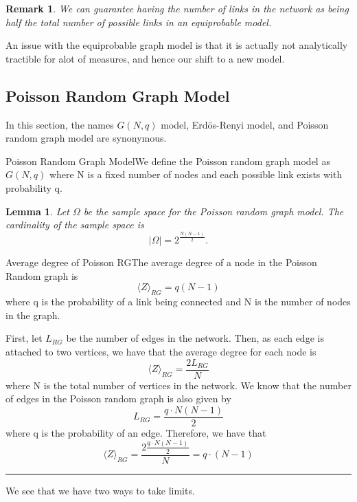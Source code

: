 \documentclass[twoside]{article}
\newtheorem{lemma}[theorem]{Lemma}
\newtheorem{remark}[theorem]{Remark}
\newenvironment{proof}{{\bf Proof:}}{\hfill\rule{2mm}{2mm}}
\begin{document}
\begin{remark}We can guarantee having the number of links in the network as being half the total number of possible links in an equiprobable model.
\end{remark}

An issue with the equiprobable graph model is that it is actually not analytically tractible for alot of measures, and hence our shift to a new model.

\subsection{Poisson Random Graph Model}

In this section, the names $G(N,q)$ model, Erdös-Renyi model, and Poisson random graph model are synonymous.
\begin{definition_exam}{Poisson Random Graph Model}{}We define the Poisson random graph model as $G(N,q)$ where N is a fixed number of nodes and each possible link exists with probability q. 
\end{definition_exam}

\begin{lemma}Let $\Omega$ be the sample space for the Poisson random graph model. The cardinality of the sample space is 
$$
|\Omega| = 2^{\frac{N(N-1)}{2}}.
$$
\end{lemma}

\begin{proposition_exam}{Average degree of Poisson RG}{}The average degree of a node in the Poisson Random graph is 
$$
\langle Z \rangle_{RG} = q(N - 1)
$$
where q is the probability of a link being connected and N is the number of nodes in the graph.
\end{proposition_exam}

\begin{proof} First, let $L_{RG}$ be the number of edges in the network. Then, as each edge is attached to two vertices, we have that the average degree for each node is 
$$
\langle Z \rangle_{RG} = \frac{2L_{RG}}{N}
$$
where N is the total number of vertices in the network. We know that the number of edges in the Poisson random graph is also given by 
$$
L_{RG} = \frac{q \cdot N(N-1)}{2}
$$
where q is the probability of an edge. Therefore, we have that 
$$
\langle Z \rangle_{RG} = \frac{2 \frac{q \cdot N(N-1)}{2}}{N} = q \cdot (N - 1)
$$
\end{proof}

We see that we have two ways to take limits. 
\end{document}
